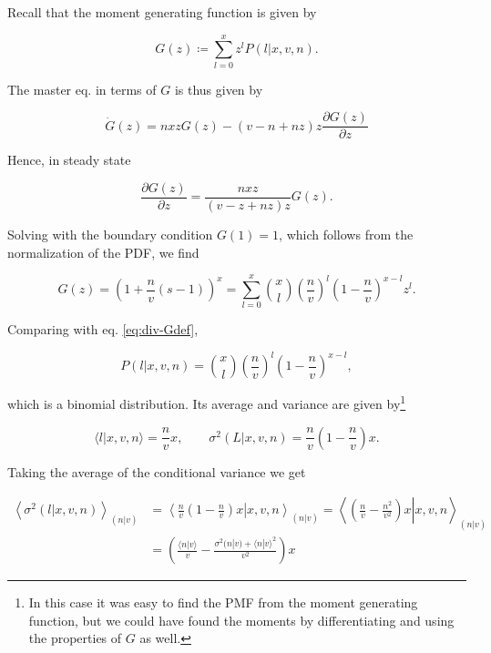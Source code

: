Recall that the moment generating function is given by

\begin{equation}
  \label{eq:div-Gdef}
  G(z) \coloneqq \sum_{l=0}^xz^lP(l|x,v,n).
\end{equation}

The master eq. in terms of $G$ is thus given by

\begin{equation*}
  \dot{G}(z) = nxzG(z) - (v-n+nz)z\frac{\partial G(z)}{\partial z}
\end{equation*}

Hence, in steady state

\begin{equation*}
  \frac{\partial G(z)}{\partial z} = \frac{nxz}{(v-z+nz)z}G(z).
\end{equation*}

Solving with the boundary condition $G(1) = 1$, which follows from the normalization of the PDF, we find

\begin{equation*}
  G(z) = \left(1+\frac{n}{v}\left(s-1\right)\right)^x = \sum_{l=0}^x {x\choose l}\left(\frac{n}{v}\right)^l\left(1-\frac{n}{v}\right)^{x-l}z^l.
\end{equation*}

Comparing with eq. \eqref{eq:div-Gdef},

\begin{equation*}
  P(l|x,v,n) = {x\choose l}\left(\frac{n}{v}\right)^l\left(1-\frac{n}{v}\right)^{x-l},
\end{equation*}

which is a binomial distribution. Its average and variance are given by\footnote{In this case it was easy to find the PMF from the moment generating function, but we could have found the moments by differentiating and using the properties of $G$ as well.}

\begin{equation*}
  \langle l|x,v,n\rangle = \frac{n}{v}x, \quad\quad \sigma^2(L|x,v,n) = \frac{n}{v}\left(1-\frac{n}{v}\right)x.
\end{equation*}

Taking the average of the conditional variance we get

\begin{equation*}
  \begin{split}
    \left\langle\sigma^2(l|x,v,n)\right\rangle_{(n|v)} &= \left\langle\left.\frac{n}{v}\left(1-\frac{n}{v}\right)x\right|x,v,n\right\rangle_{(n|v)} = \left\langle\left.\left(\frac{n}{v}-\frac{n^2}{v^2}\right)x\right|x,v,n\right\rangle_{(n|v)}\\
    &= \left(\frac{\langle n|v\rangle}{v}-\frac{\sigma^2(n|v) + \langle n|v\rangle^2}{v^2}\right)x
  \end{split}
\end{equation*}

